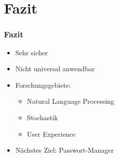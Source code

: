 \section{Fazit}

\begin{frame}[t]
	\frametitle{Fazit}

	\begin{itemize}
		\item Sehr sicher
		\item Nicht universal anwendbar
		\item Forschungsgebiete:
		\begin{itemize}
			\item Natural Language Processing
			\item Stochastik
			\item User Experience
		\end{itemize}
		\item Nächstes Ziel: Passwort-Manager
	\end{itemize}

\end{frame}